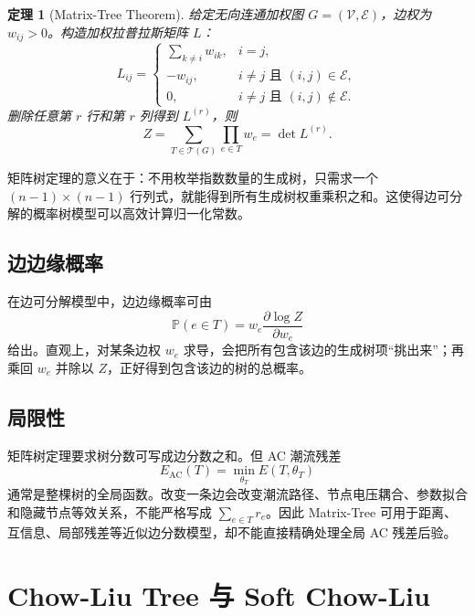 \documentclass[UTF8,12pt,openany]{ctexrep}
\numberwithin{equation}{chapter}
\theoremstyle{definition}
\theoremstyle{plain}
\newtheorem{theorem}{定理}[chapter]
\newcommand{\Prob}{\mathbb{P}}
\newcommand{\Tcal}{\mathcal{T}}
\newcommand{\Eac}{E_{\mathrm{AC}}}
\begin{document}
\begin{theorem}[Matrix-Tree Theorem]
给定无向连通加权图 $G=(\mathcal{V},\mathcal{E})$，边权为 $w_{ij}>0$。构造加权拉普拉斯矩阵 $L$：
\begin{equation}
L_{ij}=
\begin{cases}
\sum_{k\ne i}w_{ik}, & i=j,\\
-w_{ij}, & i\ne j\text{ 且 }(i,j)\in\mathcal{E},\\
0, & i\ne j\text{ 且 }(i,j)\notin\mathcal{E}.
\end{cases}
\label{eq:weighted-laplacian}
\end{equation}
删除任意第 $r$ 行和第 $r$ 列得到 $L^{(r)}$，则
\begin{equation}
Z=\sum_{T\in\Tcal(G)}\prod_{e\in T}w_e=\det L^{(r)}.
\label{eq:matrix-tree}
\end{equation}
\end{theorem}

矩阵树定理的意义在于：不用枚举指数数量的生成树，只需求一个 $(n-1)\times(n-1)$ 行列式，就能得到所有生成树权重乘积之和。这使得边可分解的概率树模型可以高效计算归一化常数。

\section{边边缘概率}

在边可分解模型中，边边缘概率可由
\begin{equation}
\Prob(e\in T)
=
w_e\frac{\partial \log Z}{\partial w_e}
\label{eq:edge-marginal-derivative}
\end{equation}
给出。直观上，对某条边权 $w_e$ 求导，会把所有包含该边的生成树项“挑出来”；再乘回 $w_e$ 并除以 $Z$，正好得到包含该边的树的总概率。

\section{局限性}

矩阵树定理要求树分数可写成边分数之和。但 AC 潮流残差
\begin{equation}
\Eac(T)=\min_{\theta_T}E(T,\theta_T)
\end{equation}
通常是整棵树的全局函数。改变一条边会改变潮流路径、节点电压耦合、参数拟合和隐藏节点等效关系，不能严格写成 $\sum_{e\in T}r_e$。因此 Matrix-Tree 可用于距离、互信息、局部残差等近似边分数模型，却不能直接精确处理全局 AC 残差后验。

\chapter{Chow-Liu Tree 与 Soft Chow-Liu}
\end{document}

